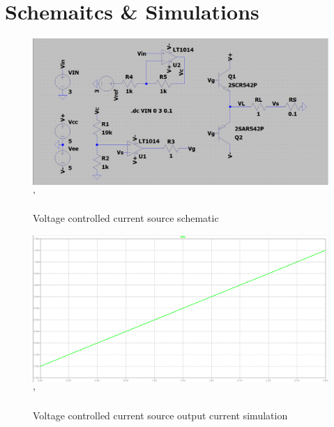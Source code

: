 \documentclass[10pt,twocolumn,letterpaper]{article}
\begin{document}
\newpage
\section{Schemaitcs \& Simulations} \label{app:schematics}

\begin{figure}[htb]
  \centering
  \includegraphics[width=\linewidth, keepaspectratio]{figures/current-source-schematic.png}'
  \caption{Voltage controlled current source schematic}
  \label{fig:schm-current-source}
\end{figure}

\begin{figure}[htb]
  \centering
  \includegraphics[width=\linewidth, keepaspectratio]{figures/current-source-output.png}'
  \caption{Voltage controlled current source output current simulation}
  \label{fig:sim-current-source-output-current}
\end{figure}
\end{document}
